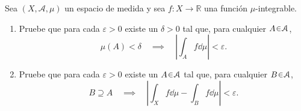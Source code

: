 \setcounter{neje}{63}
\begin{nejer}
Sea $(X, \mathcal{A}, \mu)$ un espacio de medida y sea $f\colon X \to \mathbb{R}$ una función $\mu$-integrable.
\begin{enumerate}[label = (\roman*)]
\item Pruebe que para cada $\varepsilon > 0$ existe un $\delta > 0$ tal que, para cualquier $A \en \mathcal{A}$,
$$
\mu(A) < \delta 
\quad\implies\quad 
\left| \int_A f \dd{\mu} \right| < \varepsilon.
$$

\item Pruebe que para cada $\varepsilon > 0$ existe un $A \en \mathcal{A}$ tal que, para cualquier $B \en \mathcal{A}$,
$$
B \supseteq A 
\quad\implies\quad 
\left| \int_X f \dd{\mu} - \int_B f \dd{\mu} \right| < \varepsilon.
$$
\end{enumerate}
\end{nejer}
